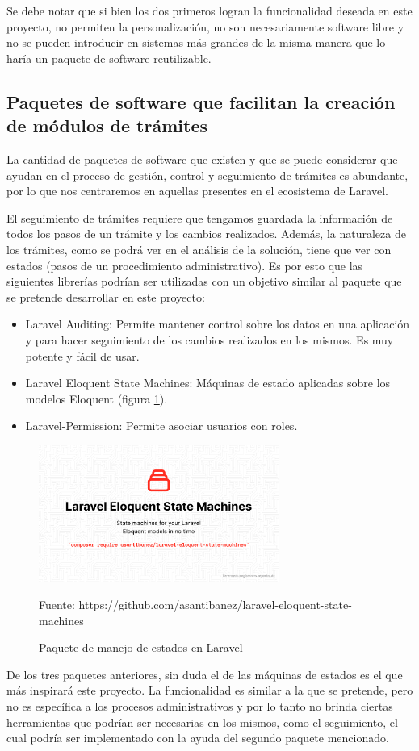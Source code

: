 Se debe notar que si bien los dos primeros logran la funcionalidad deseada en este proyecto, no permiten la personalización, no son necesariamente software libre y no se pueden introducir en sistemas más grandes de la misma manera que lo haría un paquete de software reutilizable.

\subsection{Paquetes de software que facilitan la creación de módulos de trámites}

La cantidad de paquetes de software que existen y que se puede considerar que ayudan en el proceso de gestión, control y seguimiento de trámites es abundante, por lo que nos centraremos en aquellas presentes en el ecosistema de Laravel.

El seguimiento de trámites requiere que tengamos guardada la información de todos los pasos de un trámite y los cambios realizados. Además, la naturaleza de los trámites, como se podrá ver en el análisis de la solución, tiene que ver con estados (pasos de un procedimiento administrativo). Es por esto que las siguientes librerías podrían ser utilizadas con un objetivo similar al paquete que se pretende desarrollar en este proyecto:

\begin{itemize}
    \item Laravel Auditing: Permite mantener control sobre los datos en una aplicación y para hacer seguimiento de los cambios realizados en los mismos. Es muy potente y fácil de usar.
    \item Laravel Eloquent State Machines: Máquinas de estado aplicadas sobre los modelos Eloquent (figura \ref{fig:laravelstatemachines}).
    \item Laravel-Permission: Permite asociar usuarios con roles.
\end{itemize}

\begin{figure}[!htpb]
    \centering
    \includegraphics[width=0.7\textwidth]{assets/laravelstatemachines}
    \caption{Paquete de manejo de estados en Laravel}{Fuente: https://github.com/asantibanez/laravel-eloquent-state-machines}
    \label{fig:laravelstatemachines}
\end{figure}

De los tres paquetes anteriores, sin duda el de las máquinas de estados es el que más inspirará este proyecto. La funcionalidad es similar a la que se pretende, pero no es específica a los procesos administrativos y por lo tanto no brinda ciertas herramientas que podrían ser necesarias en los mismos, como el seguimiento, el cual podría ser implementado con la ayuda del segundo paquete mencionado.
